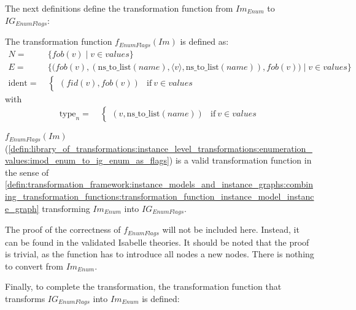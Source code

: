 The next definitions define the transformation function from $Im_{Enum}$ to $IG_{EnumFlags}$:

\begin{defin}
\label{defin:library_of_transformations:instance_level_transformations:enumeration_values:imod_enum_to_ig_enum_as_flags}
The transformation function $f_{EnumFlags}(Im)$ is defined as:
\begin{align*}
N =\ & \{fob(v) \mid v \in values \} \\
E =\ & \Big\{\Big(fob(v), (\mathrm{ns\_\!to\_\!list}(name), \langle v \rangle, \mathrm{ns\_\!to\_\!list}(name)), fob(v)\Big) \mid v \in values \Big\} \\
\mathrm{ident} =\ & \begin{cases}
    (fid(v), fob(v)) & \mathrm{if }\ v \in values
\end{cases}
\end{align*}
with
\begin{align*}
\mathrm{type}_n =\ & \begin{cases}
    (v, \mathrm{ns\_\!to\_\!list}(name)) & \mathrm{if }\ v \in values
\end{cases}
\end{align*}
\end{defin}

\begin{thm}
\label{defin:library_of_transformations:instance_level_transformations:enumeration_values:imod_enum_to_ig_enum_as_flags_func}
$f_{EnumFlags}(Im)$ (\cref{defin:library_of_transformations:instance_level_transformations:enumeration_values:imod_enum_to_ig_enum_as_flags}) is a valid transformation function in the sense of \cref{defin:transformation_framework:instance_models_and_instance_graphs:combining_transformation_functions:transformation_function_instance_model_instance_graph} transforming $Im_{Enum}$ into $IG_{EnumFlags}$.
\end{thm}

The proof of the correctness of $f_{EnumFlags}$ will not be included here. Instead, it can be found in the validated Isabelle theories. It should be noted that the proof is trivial, as the function has to introduce all nodes a new nodes. There is nothing to convert from $Im_{Enum}$.

Finally, to complete the transformation, the transformation function that transforms $IG_{EnumFlags}$ into $Im_{Enum}$ is defined:

